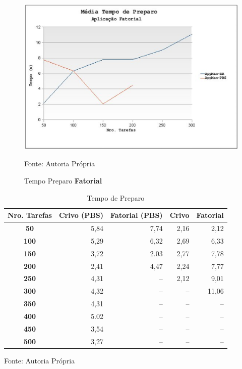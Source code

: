 \begin{figure}[hbtp]
\begin{center}
\includegraphics[scale=0.7]{./img/PreparoFatorial.ps}
\caption{Tempo Preparo \textbf{Fatorial}}
\label{fig:fatorial_preparo}
Fonte: Autoria Própria
\end{center}
\end{figure}

\begin{table}[hbtp]
\begin{center}
\caption{Tempo de Preparo}
\label{tab:tempo_preparo}
\begin{tabular}{c|r|r|r|r}
	\hline
		{\bf Nro. Tarefas } & {\bf Crivo (PBS)} & {\bf Fatorial (PBS)} & {\bf Crivo} & {\bf Fatorial}\\
	\hline
	{\bf 50} & 5,84 & 7,74 & 2,16 & 2,12\\ \hline
	{\bf 100} & 5,29 & 6,32 & 2,69 & 6,33\\ \hline
	{\bf 150} & 3,72 & 2.03 & 2,77 & 7,78\\ \hline
	{\bf 200} & 2,41 & 4,47 & 2,24 & 7,77\\ \hline
	{\bf 250} & 4,31 & -- & 2,12 & 9,01\\ \hline
	{\bf 300} & 4,32 & -- & -- & 11,06\\ \hline
	{\bf 350} & 4,31 & -- & -- & --\\ \hline
	{\bf 400} & 5.02 & -- & -- & --\\ \hline
	{\bf 450} & 3,54 & -- & -- & --\\ \hline
	{\bf 500} & 3,27 & -- & -- & --\\ \hline
\end{tabular}
\end{center}
\begin{center}
Fonte: Autoria Própria
\end{center}
\end{table}


